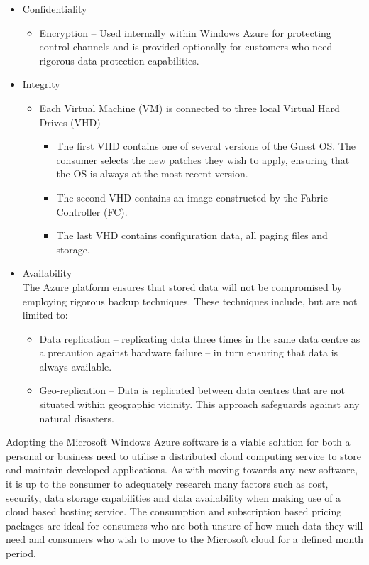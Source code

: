 \begin{itemize}
\item Confidentiality
\begin{itemize}
\item Encryption -- Used internally within Windows Azure for protecting control channels and is provided optionally for customers who need rigorous data protection capabilities. 
\end{itemize}
\item Integrity
\begin{itemize}
\item Each Virtual Machine (VM) is connected to three local Virtual Hard Drives (VHD)
\begin{itemize}
\item The first VHD contains one of several versions of the Guest OS. The consumer selects the new patches they wish to apply, ensuring that the OS is always at the most recent version.
\item The second VHD contains an image constructed by the Fabric Controller (FC).
\item The last VHD contains configuration data, all paging files and storage. 
\end{itemize}
\end{itemize}
\item Availability \\ The Azure platform ensures that stored data will not be compromised by employing rigorous backup techniques. These techniques include, but are not limited to\ftAfour:\ftAfourText
\begin{itemize}
\item Data replication -- replicating data three times in the same data centre as a precaution against hardware failure – in turn ensuring that data is always available.
\item Geo-replication -- Data is replicated between data centres that are not situated within geographic vicinity. This approach safeguards against any natural disasters.
\end{itemize}
\end{itemize}

Adopting the Microsoft Windows Azure software is a viable solution for both a personal or business need to utilise a distributed cloud computing service to store and maintain developed applications. As with moving towards any new software, it is up to the consumer to adequately research many factors such as cost, security, data storage capabilities and data availability when making use of a cloud based hosting service. The consumption and subscription based pricing packages are ideal for consumers who are both unsure of how much data they will need and consumers who wish to move to the Microsoft cloud for a defined month period.